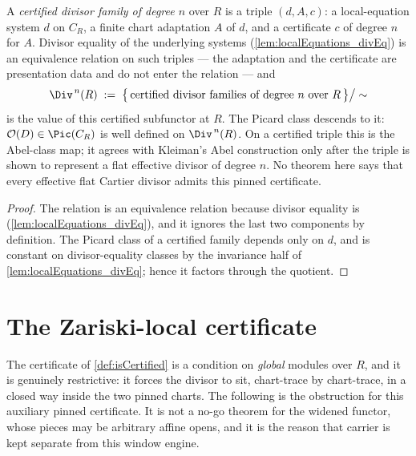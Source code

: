 \begin{definition}
  \label{def:certifiedDivisorFamily}
  \leanok
  A \emph{certified divisor family of degree \(n\)} over \(R\) is a triple \((d, A, c)\):
  a local-equation system \(d\) on \(C_R\), a finite chart adaptation \(A\) of \(d\), and a
  certificate \(c\) of degree \(n\) for \(A\). Divisor equality of the underlying systems
  (\ref{lem:localEquations_divEq}) is an equivalence relation on such triples --- the
  adaptation and the certificate are presentation data and do not enter the relation ---
  and
  \[
    \Div^{\,n}(R) \;:=\; \bigl\{\,\text{certified divisor families of degree }n\text{ over }
      R\,\bigr\} \big/ \sim
  \]
  is the value of this certified subfunctor at \(R\). The Picard class descends to it:
  \(\mathcal{O}(D) \in \Pic(C_R)\) is well defined on \(\Div^{\,n}(R)\).  On a certified
  triple this is the Abel-class map; it agrees with Kleiman's Abel construction only after
  the triple is shown to represent a flat effective divisor of degree \(n\).  No theorem here
  says that every effective flat Cartier divisor admits this pinned certificate.
\end{definition}
\begin{proof}
  \leanok
  The relation is an equivalence relation because divisor equality is
  (\ref{lem:localEquations_divEq}), and it ignores the last two components by definition.
  The Picard class of a certified family depends only on \(d\), and is constant on
  divisor-equality classes by the invariance half of \ref{lem:localEquations_divEq}; hence
  it factors through the quotient.
\end{proof}

\section{The Zariski-local certificate}
\label{sec:divfamzar}

The certificate of \ref{def:isCertified} is a condition on \emph{global} modules over
\(R\), and it is genuinely restrictive: it forces the divisor to sit, chart-trace by
chart-trace, in a closed way inside the two pinned charts.  The following is the obstruction
for this auxiliary pinned certificate.  It is not a no-go theorem for the widened functor,
whose pieces may be arbitrary affine opens, and it is the reason that carrier is kept
separate from this window engine.

